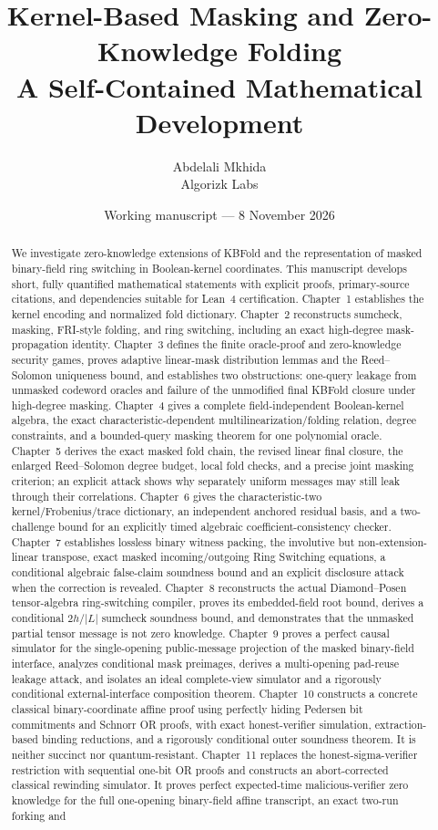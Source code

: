 \documentclass[11pt]{article}
\title{Kernel-Based Masking and Zero-Knowledge Folding\\\large A Self-Contained Mathematical Development}
\author{Abdelali Mkhida\\Algorizk Labs}
\date{Working manuscript --- 8 November 2026}
\numberwithin{equation}{section}
\theoremstyle{definition}
\theoremstyle{remark}
\begin{document}
\maketitle
\begin{abstract}
We investigate zero-knowledge extensions of KBFold and the representation of masked binary-field ring switching in Boolean-kernel coordinates. This manuscript develops short, fully quantified mathematical statements with explicit proofs, primary-source citations, and dependencies suitable for Lean~4 certification. Chapter~1 establishes the kernel encoding and normalized fold dictionary. Chapter~2 reconstructs sumcheck, masking, FRI-style folding, and ring switching, including an exact high-degree mask-propagation identity. Chapter~3 defines the finite oracle-proof and zero-knowledge security games, proves adaptive linear-mask distribution lemmas and the Reed--Solomon uniqueness bound, and establishes two obstructions: one-query leakage from unmasked codeword oracles and failure of the unmodified final KBFold closure under high-degree masking. Chapter~4 gives a complete field-independent Boolean-kernel algebra, the exact characteristic-dependent multilinearization/folding relation, degree constraints, and a bounded-query masking theorem for one polynomial oracle. Chapter~5 derives the exact masked fold chain, the revised linear final closure, the enlarged Reed--Solomon degree budget, local fold checks, and a precise joint masking criterion; an explicit attack shows why separately uniform messages may still leak through their correlations. Chapter~6 gives the characteristic-two kernel/Frobenius/trace dictionary, an independent anchored residual basis, and a two-challenge bound for an explicitly timed algebraic coefficient-consistency checker. Chapter~7 establishes lossless binary witness packing, the involutive but non-extension-linear transpose, exact masked incoming/outgoing Ring Switching equations, a conditional algebraic false-claim soundness bound and an explicit disclosure attack when the correction is revealed. Chapter~8 reconstructs the actual Diamond--Posen tensor-algebra ring-switching compiler, proves its embedded-field root bound, derives a conditional $2h/|L|$ sumcheck soundness bound, and demonstrates that the unmasked partial tensor message is not zero knowledge. Chapter~9 proves a perfect causal simulator for the single-opening public-message projection of the masked binary-field interface, analyzes conditional mask preimages, derives a multi-opening pad-reuse leakage attack, and isolates an ideal complete-view simulator and a rigorously conditional external-interface composition theorem. Chapter~10 constructs a concrete classical binary-coordinate affine proof using perfectly hiding Pedersen bit commitments and Schnorr OR proofs, with exact honest-verifier simulation, extraction-based binding reductions, and a rigorously conditional outer soundness theorem. It is neither succinct nor quantum-resistant. Chapter~11 replaces the honest-sigma-verifier restriction with sequential one-bit OR proofs and constructs an abort-corrected classical rewinding simulator. It proves perfect expected-time malicious-verifier zero knowledge for the full one-opening binary-field affine transcript, an exact two-run forking and 
\end{abstract}
\end{document}
